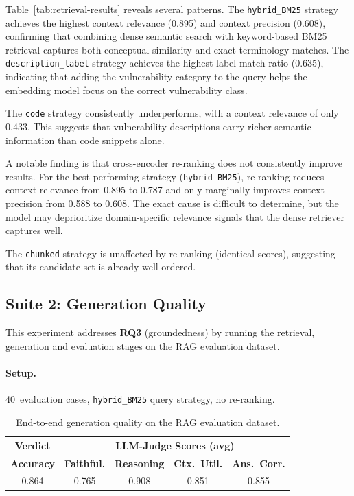 Table~\ref{tab:retrieval-results} reveals several patterns. The \texttt{hybrid\_BM25} strategy achieves the highest context relevance (0.895) and context precision (0.608), confirming that combining dense semantic search with keyword-based BM25 retrieval captures both conceptual similarity and exact terminology matches. The \texttt{description\_label} strategy achieves the highest label match ratio (0.635), indicating that adding the vulnerability category to the query helps the embedding model focus on the correct vulnerability class.

The \texttt{code} strategy consistently underperforms, with a context relevance of only 0.433. This suggests that vulnerability descriptions carry richer semantic information than code snippets alone.

A notable finding is that cross-encoder re-ranking does not consistently improve results. For the best-performing strategy (\texttt{hybrid\_BM25}), re-ranking reduces context relevance from 0.895 to 0.787 and only marginally improves context precision from 0.588 to 0.608. The exact cause is difficult to determine, but the model may deprioritize domain-specific relevance signals that the dense retriever captures well.

The \texttt{chunked} strategy is unaffected by re-ranking (identical scores), suggesting that its candidate set is already well-ordered.

\subsection{Suite 2: Generation Quality}
\label{subsec:suite2}

This experiment addresses \textbf{RQ3} (groundedness) by running the retrieval, generation and evaluation stages on the RAG evaluation dataset.

\paragraph{Setup.} 40~evaluation cases, \texttt{hybrid\_BM25} query strategy, no re-ranking.

\begin{table}[!ht]
\centering
\small
\renewcommand{\arraystretch}{1.3}
\begin{tabular*}{\textwidth}{@{\extracolsep{\fill}} ccccc}
\toprule
\textbf{Verdict} & \multicolumn{4}{c}{\textbf{LLM-Judge Scores (avg)}} \\
\midrule
\textbf{Accuracy} & \textbf{Faithful.} & \textbf{Reasoning} & \textbf{Ctx.\ Util.} & \textbf{Ans.\ Corr.} \\
\midrule
0.864 & 0.765 & 0.908 & 0.851 & 0.855 \\
\bottomrule
\end{tabular*}
\caption[End-to-end generation quality.]{End-to-end generation quality on the RAG evaluation dataset.}
\label{tab:pipeline-generation-results}
\end{table}

